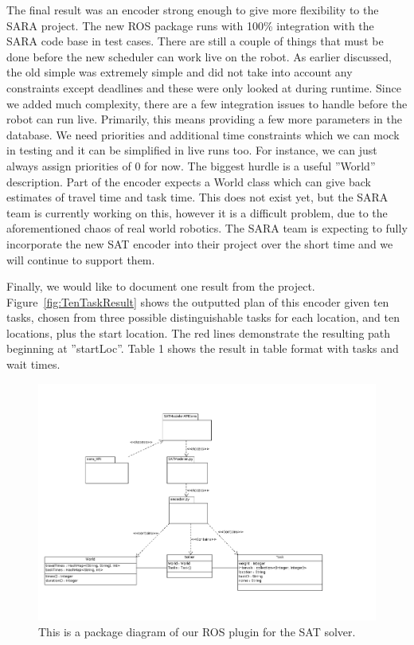 \documentclass{article}
\begin{document}
The final result was an encoder strong enough to give more flexibility to the SARA project. The new ROS package runs with 100\% integration with the SARA code base in test cases. There are still a couple of things that must be done before the new scheduler can work live on the robot. As earlier discussed, the old simple was extremely simple and did not take into account any constraints except deadlines and these were only looked at during runtime. Since we added much complexity, there are a few integration issues to handle before the robot can run live. Primarily, this means providing a few more parameters in the database. We need priorities and additional time constraints which we can mock in testing and it can be simplified in live runs too. For instance, we can just always assign priorities of 0 for now. The biggest hurdle is a useful ''World'' description. Part of the encoder expects a World class which can give back estimates of travel time and task time. This does not exist yet, but the SARA team is currently working on this, however it is a difficult problem, due to the aforementioned chaos of real world robotics. The SARA team is expecting to fully incorporate the new SAT encoder into their project over the short time and we will continue to support them.

Finally, we would like to document one result from the project. Figure~\ref{fig:TenTaskResult} shows the outputted plan of this encoder given ten tasks, chosen from three possible distinguishable tasks for each location, and ten locations, plus the start location. The red lines demonstrate the resulting path beginning at ''startLoc''. Table 1 shows the result in table format with tasks and wait times.


\begin{figure}
\centering
\includegraphics[width=1.0\textwidth]{ROS_Package_Diagram.png}
\caption{\label{fig:ROSPackageDiag}This is a package diagram of our ROS plugin for the SAT solver.}
\end{figure}
\end{document}
